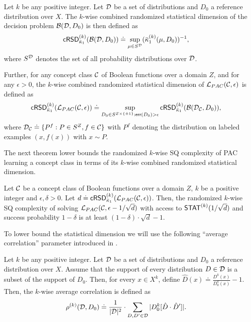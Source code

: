 \begin{defn}\label{def:csdr}
Let $k$ be any positive integer. Let $\mathcal{D}$ be a set of distributions and $D_0$ a reference distribution over $X$. The $k$-wise combined randomized statistical dimension of the decision problem $\mathcal{B}(\mathcal{D},D_0)$ is then defined as
$$ \mathsf{cRSD}_{\bar{\kappa}_1}^{(k)}(\mathcal{B}(\mathcal{D},D_0)) \doteq \sup_{\mu \in S^{\mathcal{D}}} (\bar{\kappa}_1^{(k)}(\mu,D_0))^{-1}, $$
where $S^{\mathcal{D}}$ denotes the set of all probability distributions over $\mathcal{D}$.

Further, for any concept class $\mathcal{C}$ of Boolean functions over a domain $Z$, and for any $\epsilon > 0$, the $k$-wise combined randomized statistical dimension of $\mathcal{L}_{PAC}(\mathcal{C},\epsilon)$ is defined as
\begin{equation*}
\mathsf{cRSD}_{\bar{\kappa}_1}^{(k)}(\mathcal{L}_{PAC}(\mathcal{C},\epsilon)) \doteq \sup_{D_0 \in S^{Z \times \{\pm 1\}}: \mathsf{err}(D_0) > \epsilon} \mathsf{cRSD}_{\bar{\kappa}_1}^{(k)}(\mathcal{B}(\mathcal{D}_{\mathcal{C}},D_0)),
\end{equation*}
where $\mathcal{D}_{\mathcal{C}} \doteq \{ P^f: P \in S^{Z}, f \in \mathcal{C}\}$ with $P^f$ denoting the distribution on labeled examples $(x,f(x))$ with $x \sim P$.
\end{defn}

The next theorem lower bounds the randomized $k$-wise SQ complexity of PAC learning a concept class in terms of its $k$-wise combined randomized statistical dimension.%

\begin{theorem}\label{thm:sq_RSD}
Let $\mathcal{C}$ be a concept class of Boolean functions over a domain $Z$, $k$ be a positive integer and $\epsilon, \delta > 0$. Let $d \doteq \mathsf{cRSD}_{\bar{\kappa}_1}^{(k)}(\mathcal{L}_{PAC}(\mathcal{C},\epsilon))$. Then, the randomized $k$-wise SQ complexity of solving $\mathcal{L}_{PAC}(\mathcal{C},\epsilon - 1/\sqrt{d})$ with access to $\mathsf{STAT}^{(k)}(1/\sqrt{d})$ and success probability $1-\delta$ is at least $(1-\delta) \cdot \sqrt{d} - 1$.
\end{theorem}


To lower bound the statistical dimension we will use the following ``average correlation'' parameter introduced in \cite{FeldmanGRVX:12}.
\begin{defn}\label{def:rho}
Let $k$ be any positive integer. Let $\mathcal{D}$ be a set of distributions and $D_0$ a reference distribution over $X$. Assume that the support of every distribution $D \in \mathcal{D}$ is a subset of the support of $D_0$. Then, for every $x \in X^k$, define $\hat{D}(x) \doteq \frac{D^k(x)}{D_0^k(x)} - 1$. Then, the $k$-wise average correlation is defined as
$$ \rho^{(k)}(\mathcal{D},D_0) \doteq \frac{1}{|\mathcal{D}|^2} \cdot \displaystyle\sum\limits_{D, D' \in \mathcal{D}} | D_0^k[\hat{D} \cdot \hat{D}']|. $$
\end{defn}

